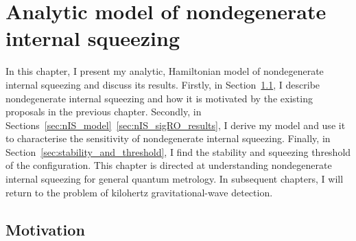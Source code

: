 \chapter{Analytic model of nondegenerate internal squeezing} %
\label{chp:nIS_analytics}




In this chapter, I present my analytic, Hamiltonian model of nondegenerate internal squeezing and discuss its results.
Firstly, in Section~\ref{sec:modal_equivalence}, I describe nondegenerate internal squeezing and how it is motivated by the existing proposals in the previous chapter. Secondly, in Sections~\ref{sec:nIS_model}~\ref{sec:nIS_sigRO_results}, I derive my model and use it to characterise the sensitivity of nondegenerate internal squeezing. %
Finally, in Section~\ref{sec:stability_and_threshold}, I find the stability and squeezing threshold of the configuration. %
This chapter is directed at understanding nondegenerate internal squeezing for general quantum metrology. In subsequent chapters, I will return to the problem of kilohertz gravitational-wave detection. %


\section{Motivation} %
\label{sec:modal_equivalence}

